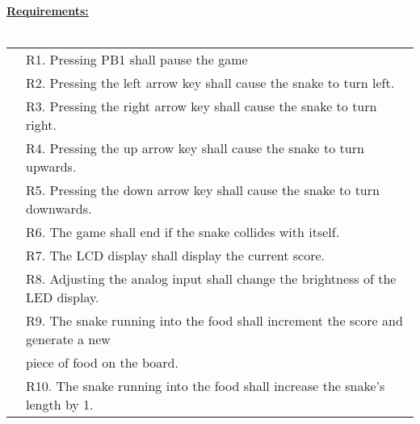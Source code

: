 \documentclass[11pt]{article}
\begin{document}
    \noindent \textbf{\underline{Requirements:}} \\ \\
    \begin{tabular}{rl}
        \indent & R1. Pressing PB1 shall pause the game \\
        & R2. Pressing the left arrow key shall cause the snake to turn left. \\
        & R3. Pressing the right arrow key shall cause the snake to turn right. \\
        & R4. Pressing the up arrow key shall cause the snake to turn upwards. \\
        & R5. Pressing the down arrow key shall cause the snake to turn downwards. \\
        & R6. The game shall end if the snake collides with itself. \\
        & R7. The LCD display shall display the current score. \\
        & R8. Adjusting the analog input shall change the brightness of the LED display. \\
        & R9. The snake running into the food shall increment the score and generate a new \\ 
        & piece of food on the board. \\         
        & R10. The snake running into the food shall increase the snake's length by 1.
    \end{tabular} \\
\end{document}
